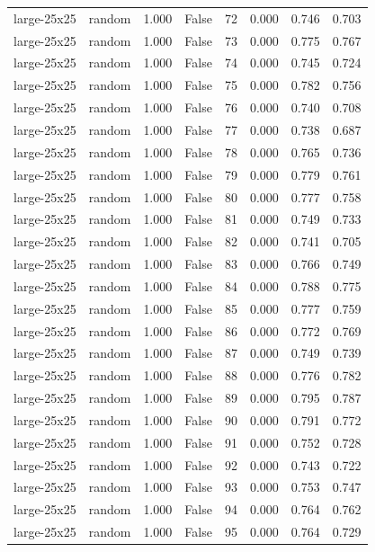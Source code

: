 \begin{tabular}{llrrrrrr}
large-25x25 & random & 1.000 & False & 72 & 0.000 & 0.746 & 0.703 \\
large-25x25 & random & 1.000 & False & 73 & 0.000 & 0.775 & 0.767 \\
large-25x25 & random & 1.000 & False & 74 & 0.000 & 0.745 & 0.724 \\
large-25x25 & random & 1.000 & False & 75 & 0.000 & 0.782 & 0.756 \\
large-25x25 & random & 1.000 & False & 76 & 0.000 & 0.740 & 0.708 \\
large-25x25 & random & 1.000 & False & 77 & 0.000 & 0.738 & 0.687 \\
large-25x25 & random & 1.000 & False & 78 & 0.000 & 0.765 & 0.736 \\
large-25x25 & random & 1.000 & False & 79 & 0.000 & 0.779 & 0.761 \\
large-25x25 & random & 1.000 & False & 80 & 0.000 & 0.777 & 0.758 \\
large-25x25 & random & 1.000 & False & 81 & 0.000 & 0.749 & 0.733 \\
large-25x25 & random & 1.000 & False & 82 & 0.000 & 0.741 & 0.705 \\
large-25x25 & random & 1.000 & False & 83 & 0.000 & 0.766 & 0.749 \\
large-25x25 & random & 1.000 & False & 84 & 0.000 & 0.788 & 0.775 \\
large-25x25 & random & 1.000 & False & 85 & 0.000 & 0.777 & 0.759 \\
large-25x25 & random & 1.000 & False & 86 & 0.000 & 0.772 & 0.769 \\
large-25x25 & random & 1.000 & False & 87 & 0.000 & 0.749 & 0.739 \\
large-25x25 & random & 1.000 & False & 88 & 0.000 & 0.776 & 0.782 \\
large-25x25 & random & 1.000 & False & 89 & 0.000 & 0.795 & 0.787 \\
large-25x25 & random & 1.000 & False & 90 & 0.000 & 0.791 & 0.772 \\
large-25x25 & random & 1.000 & False & 91 & 0.000 & 0.752 & 0.728 \\
large-25x25 & random & 1.000 & False & 92 & 0.000 & 0.743 & 0.722 \\
large-25x25 & random & 1.000 & False & 93 & 0.000 & 0.753 & 0.747 \\
large-25x25 & random & 1.000 & False & 94 & 0.000 & 0.764 & 0.762 \\
large-25x25 & random & 1.000 & False & 95 & 0.000 & 0.764 & 0.729 \\

\end{tabular}
